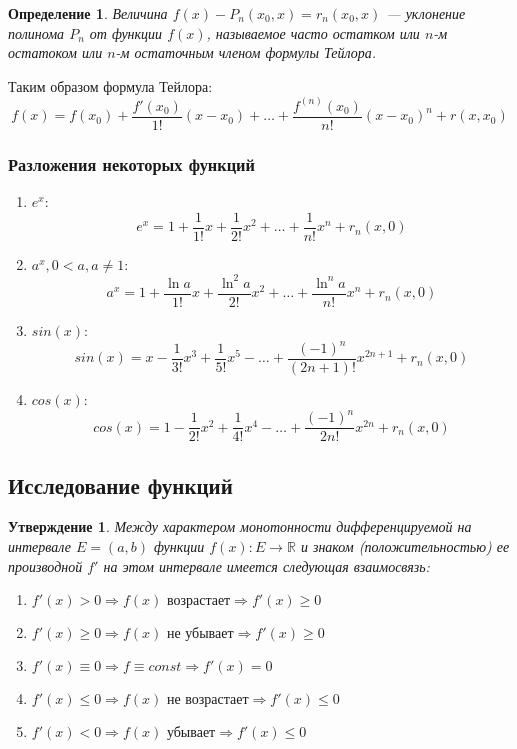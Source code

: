\documentclass[12pt]{report}
\theoremstyle{plain}
\newtheorem{definition}[theorem]{Определение}
\newtheorem{statement}[theorem]{Утверждение}
\newcommand{\R}{\mathbb R}
\begin{document}
\begin{definition}
Величина $f(x) - P_n(x_0, x) = r_n(x_0, x)$ --- уклонение
полинома $P_n$ от функции $f(x)$, называемое часто остатком
или $n$-м остатоком или $n$-м остаточным членом формулы Тейлора.
\end{definition}

Таким образом формула Тейлора:
$$
f(x) = f(x_0) + \dfrac{f'(x_0)}{1!}(x - x_0)+ \dots + 
\dfrac{f^{(n)}(x_0)}{n!} (x - x_0)^n + r(x, x_0)
$$

\subsubsection{Разложения некоторых функций}
\begin{enumerate}
\item $e^x$:
  $$
    e^x = 1 + \dfrac{1}{1!} x + \dfrac{1}{2!} x^2 + \dots + \dfrac{1}{n!} x^n + r_n(x, 0)
  $$
\item $a^x, 0 < a, a \ne 1$:
  $$
    a^x = 1 + \dfrac{\ln a}{1!} x + \dfrac{\ln^2 a}{2!} x^2 + \dots + \dfrac{\ln^n a}{n!} x^n + r_n(x, 0)
  $$
\item $sin(x)$:
  $$
    sin(x) = x - \dfrac{1}{3!} x^3 + \dfrac{1}{5!} x^5 - \dots + \dfrac{(-1)^n}{(2n + 1)!} x^{2n+1} + r_n(x, 0)
  $$
\item $cos(x)$:
  $$
    cos(x) = 1 - \dfrac{1}{2!} x^2 + \dfrac{1}{4!} x^4 - \dots + \dfrac{(-1)^n}{2n!} x^{2n} + r_n(x, 0)
  $$
\end{enumerate}

\subsection{Исследование функций}
\begin{statement}
Между характером монотонности дифференцируемой на интервале $E = (a, b)$
функции $f(x): E \rightarrow \R$ и знаком (положительностью) ее производной
$f'$ на этом интервале имеется следующая взаимосвязь:
\begin{enumerate}
\item $f'(x) > 0 \Rightarrow f(x) \text{ возрастает} \Rightarrow f'(x) \ge 0$
\item $f'(x) \ge 0 \Rightarrow f(x) \text{ не убывает} \Rightarrow f'(x) \ge 0$
\item $f'(x) \equiv 0 \Rightarrow f \equiv const \Rightarrow f'(x) = 0$
\item $f'(x) \le 0 \Rightarrow f(x) \text{ не возрастает} \Rightarrow f'(x) \le 0$
\item $f'(x) < 0 \Rightarrow f(x) \text{ убывает} \Rightarrow f'(x) \le 0$
\end{enumerate}
\end{statement}
\end{document}
